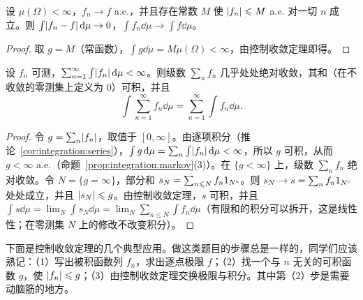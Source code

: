 \begin{corollary}[有界收敛定理]\label{cor:integration:bct}
设 $\mu(\Omega)<\infty$，$f_n\to f$ a.e.，并且存在常数 $M$ 使 $\lvert f_n\rvert\leqslant M$ a.e. 对一切 $n$ 成立。则 $\int\lvert f_n-f\rvert\,\mathrm{d}\mu\to0$，$\int f_n\dd\mu\to\int f\dd\mu$。
\end{corollary}
\begin{proof}
取 $g=M$（常函数），$\int g\dd\mu=M\mu(\Omega)<\infty$，由控制收敛定理即得。
\end{proof}

\begin{corollary}[可积函数项级数的逐项积分]\label{cor:integration:series-integrable}
设 $f_n$ 可测，$\sum_{n=1}^\infty\int\lvert f_n\rvert\,\mathrm{d}\mu<\infty$。则级数 $\sum_nf_n$ 几乎处处绝对收敛，其和（在不收敛的零测集上定义为 $0$）可积，并且
\[
\int\sum_{n=1}^\infty f_n\dd\mu=\sum_{n=1}^\infty\int f_n\dd\mu .
\]
\end{corollary}
\begin{proof}
令 $g=\sum_n\lvert f_n\rvert$，取值于 $[0,\infty]$。由逐项积分（推论~\ref{cor:integration:series}），$\int g\,\mathrm{d}\mu=\sum_n\int\lvert f_n\rvert\,\mathrm{d}\mu<\infty$，所以 $g$ 可积，从而 $g<\infty$ a.e.（命题~\ref{prop:integration:markov}(3)）。在 $\{g<\infty\}$ 上，级数 $\sum_nf_n$ 绝对收敛。令 $N=\{g=\infty\}$，部分和 $s_N=\sum_{n\leqslant N}f_n1_{N^c}$。则 $s_N\to s=\sum_nf_n1_{N^c}$ 处处成立，并且 $\lvert s_N\rvert\leqslant g$。由控制收敛定理，$s$ 可积，并且 $\int s\dd\mu=\lim_N\int s_N\dd\mu=\lim_N\sum_{n\leqslant N}\int f_n\dd\mu$（有限和的积分可以拆开，这是线性性；在零测集 $N$ 上的修改不改变积分）。
\end{proof}

下面是控制收敛定理的几个典型应用。做这类题目的步骤总是一样的，同学们应该熟记：（1）写出被积函数列 $f_n$，求出逐点极限 $f$；（2）找一个与 $n$ 无关的可积函数 $g$，使 $\lvert f_n\rvert\leqslant g$；（3）由控制收敛定理交换极限与积分。其中第（2）步是需要动脑筋的地方。

